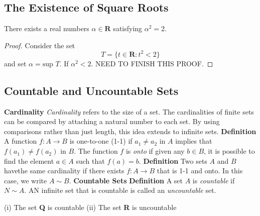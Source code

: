         \subsection*{The Existence of Square Roots}
        \begin{theorem}
            There exists a real numbers $\alpha \in \textbf{R}$ satisfying $\alpha ^ 2 = 2$.
        \end{theorem}
        \begin{proof}
            Consider the set
            \begin{equation*}
                T = \{t \in \textbf{R}: t^2 < 2\}
            \end{equation*}
            and set $\alpha = \text{sup } T$. If $\alpha ^ 2 < 2$. NEED TO FINISH THIS PROOF.
        \end{proof}
    \subsection*{Countable and Uncountable Sets}
        \textbf{Cardinality}
            \newline
            \textit{Cardinality} refers to the size of a set. The cardinalities of finite sets can be compared by attaching a natural number to each set. By using comparisons rather than just length, this idea extends to infinite sets.
            \newline  \newline
            \textbf{Definition} A function $f: A \rightarrow B$ is one-to-one (1-1) if $a_1 \neq a_2$ in $A$ implies that $f(a_1) \neq f(a_2)$ in $B$. The function $f$ is \textit{onto} if given any $b \in B$, it is possible to find the element $a \in A$ such that $f(a) = b$.
            \textbf{Definition} Two sets $A$ and $B$ havethe same cardinality if there exists $f: A \rightarrow B$ that is 1-1 and onto. In this case, we write $A \sim B$.
            \newline
        \textbf{Countable Sets}
            \newline
            \textbf{Definition} A set $A$ is \textit{countable} if $N \sim A$. AN infinite set that is countable is called an \textit{uncountable} set.
            \begin{theorem}
                (i) The set \textbf{Q} is countable
                \newline
                (ii) The set \textbf{R} is uncountable
            \end{theorem}
